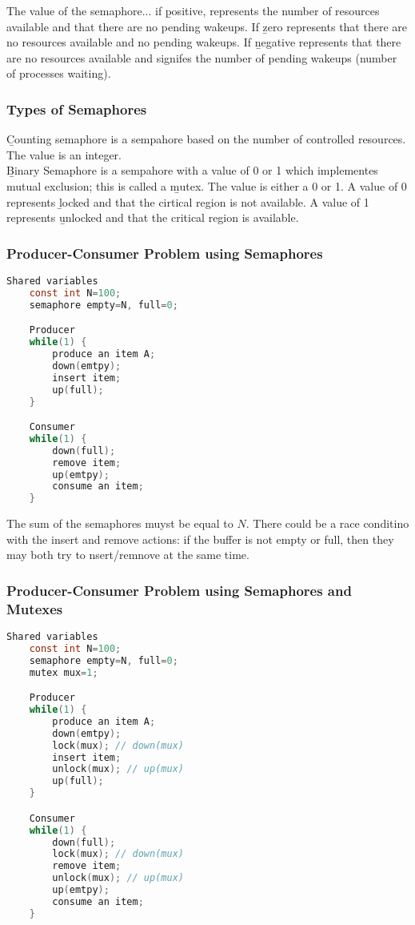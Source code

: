 \documentclass{article}
\begin{document}
    \noindent The value of the semaphore... if \b{positive}, represents the number of resources available and that there are no pending wakeups. If \b{zero} represents that there are no resources available and no pending wakeups. If \b{negative} represents that there are no resources available and signifes the number of pending wakeups (number of processes waiting). 

    \subsubsection{Types of Semaphores}

    \b{Counting semaphore} is a sempahore based on the number of controlled resources. The value is an integer. \\ 

    \noindent \b{Binary Semaphore} is a sempahore with a value of 0 or 1 which implementes mutual exclusion; this is called a \b{mutex}. The value is either a 0 or 1. A value of 0 represents \b{locked} and that the cirtical region is not available. A value of 1 represents \b{unlocked} and that the critical region is available.

    \subsubsection{Producer-Consumer Problem using Semaphores}

    \begin{lstlisting}[language=C]
    Shared variables
    const int N=100;
    semaphore empty=N, full=0;

    Producer
    while(1) {
        produce an item A; 
        down(emtpy);
        insert item;
        up(full);
    }

    Consumer 
    while(1) {
        down(full);
        remove item;
        up(emtpy);
        consume an item;
    }
    \end{lstlisting}

    The sum of the semaphores muyst be equal to $N$. There could be a race conditino with the insert and remove actions: if the buffer is not empty or full, then they may both try to nsert/remnove at the same time.
    
    \subsubsection{Producer-Consumer Problem using Semaphores and Mutexes}

    \begin{lstlisting}[language=C]
    Shared variables
    const int N=100;
    semaphore empty=N, full=0;
    mutex mux=1;

    Producer
    while(1) {
        produce an item A; 
        down(emtpy);
        lock(mux); // down(mux)
        insert item;
        unlock(mux); // up(mux)
        up(full);
    }

    Consumer 
    while(1) {
        down(full);
        lock(mux); // down(mux)
        remove item;
        unlock(mux); // up(mux)
        up(emtpy);
        consume an item;
    }
    \end{lstlisting}
\end{document}
